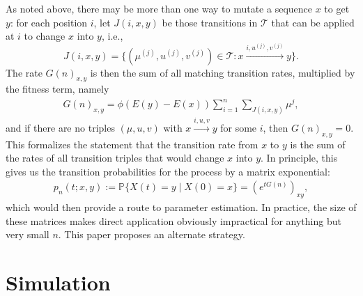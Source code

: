 \documentclass{article}
\renewcommand{\P}{\mathbb{P}}
\newcommand{\calT}{\mathcal{T}}  %
\newcommand{\st}{\colon}  %
\theoremstyle{plain}
\theoremstyle{definition}
\begin{document}
As noted above, there may be more than one way to mutate a sequence $x$ to get $y$:
for each position $i$, let $J(i,x,y)$ be those transitions in $\calT$ that can be applied at $i$
to change $x$ into $y$, i.e.,
\[
    J(i,x,y) = \{ (\mu^{(j)},u^{(j)},v^{(j)}) \in \calT \st x \xrightarrow{i,u^{(j)},v^{(j)}} y \}.
\]
The rate ${G(n)}_{x,y}$ is then the sum of all matching transition rates,
multiplied by the fitness term,
namely
\begin{align} \label{eqn:G_defn}
    {G(n)}_{x,y} = \phi\left(E(y)-E(x)\right) \sum_{i=1}^n \sum_{J(i,x,y)}  \mu^j ,
\end{align}
and if there are no triples $(\mu,u,v)$ with $x \xrightarrow{i,u,v} y$ for some $i$, then ${G(n)}_{x,y}=0$.
This formalizes the statement that the transition rate from $x$ to $y$ is the sum of the rates of all transition triples
that would change $x$ into $y$.
In principle, this gives us the transition probabilities for the process by a matrix exponential:
\begin{align} \label{eqn:full_likelihood}
    p_n(t;x,y) := \P\{ X(t) = y \mid X(0) = x \} = {\left(e^{tG(n)}\right)}_{xy} ,
\end{align}
which would then provide a route to parameter estimation.
In practice, the size of these matrices makes direct application obviously impractical for anything but very small $n$.
This paper proposes an alternate strategy.


\section{Simulation}
\end{document}
